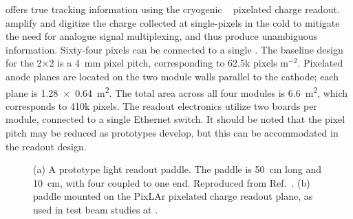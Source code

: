  offers true \threed tracking information using the  cryogenic ~\cite{larpix} pixelated charge readout.   amplify and digitize the charge collected at single-pixels in the cold to mitigate the need for analogue signal multiplexing, and thus produce unambiguous \threed information. Sixty-four pixels can be connected to a single  . The baseline design for the 2$\times$2 is a \SI{4}{\milli\metre} pixel pitch, corresponding to 62.5k pixels m$^{-2}$. Pixelated anode planes are located on the two module walls parallel to the cathode; each plane is \SI[product-units=repeat]{1.28x0.64}{\metre\squared}. The total area across all four modules is \SI{6.6}{\metre\squared}, which corresponds to 410k pixels. The readout electronics utilize two  boards per module, connected to a single Ethernet switch. It should be noted that the pixel pitch may be reduced as prototypes develop, but this can be accommodated in the readout design. 

\begin{figure}[!ht]
	\centering
	\caption[A prototype ArgonCube light readout paddle and a mounted ArCLight paddle]{(a) A prototype  light readout paddle. The paddle is \SI{50}{cm} long and \SI{10}{cm}, with four  coupled to one end. Reproduced from Ref.~\cite{argoncube_loi}. (b)  paddle mounted on the PixLAr pixelated charge readout plane, as used in test beam studies at .}
	\label{fig:arclight}
\end{figure}




